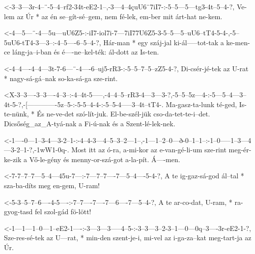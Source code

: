   {<-3--3---3r-4--¨-5--4--rf2-34t-eE2-1--,-3---4--4çuU6¨7iI7-:-5--5---5---tg3-4t--5--4-?,}
  {  Ve-lem az Úr * az én se--gít-sé--gem, nem fé-lek,         em-ber mit árt-hat ne-kem.}

  {<-4---5---¨-4---5u---uU6Z5-:-iI7-iol7i-7---7iI77U6Z5-3-5--5---5--uU6--tT4-5-4-,-5--5uU6-tT4-3---3--:-4--5----6--5--4-?,}
  {  Hár-man * egy száj-jal     ki-ál-----tot-tak       a ke-men-ce láng-ja--i-ban és é----ne--kel-ték: ál-dott az Is-ten.}

  {<-4--4----4--4---3t-7-6---¨-4----6--uj5-rR3-:-5--5--7--5--zZ5-4-?,}
  {  Di-csér-jé-tek az U-rat * nagy-sá-gá--nak   so-ka-sá-ga sze-rint.}

  {<X-3--3----3--3----4--3--:-4--4t-5-----,-4--4--5--rR3-4---3---3-?,-5--5--5z---4-:-5---5--4---3--4t-5-?,-[-------------5z--5-:-5-5--4-4-:-5--5-4-----3--4t--tT4-.}
  {   Ma-gasz-ta-lunk té-ged, Is-te-nünk, * És ne-ve-det szó-lít-juk. El-be-szél-jük cso-da-tet-te-i--det. Dicsőség_az_A-tyá-nak a Fi-ú-nak és a Szent-lé-lek-nek.}



  {<-1----0---1--3-4---3-2--1-:-4--4-3---4--5--3--2---1--,-1---1--2--0---ð-0--1--1--:-1--0-----1--3---4---3-2--1-?,-1wW1-0q-.}
  {  Most itt az ó-ra, a-mi-kor az e-van-gé-li-um sze-rint meg-ér-ke-zik a Vő-le-gény és menny-or-szá-got a-la-pít. Á----men.}

  {<-7-7--7--7---5--4---45u-7---:-7---7--7----7---5--4----5-4-?,}
  {  A te ig-gaz-sá-god ál--tal * sza-ba-díts meg en-gem, U-ram!}

  {<-5-3--5--7--6----4-5----:-7--7----7----7---6----7---5--4-?,}
  {  A te ar-co-dat, U-ram, * ra-gyog-tasd fel szol-gád fö-lött!}

  {<-1---1---1--0---1--eE2-1----:-3---3---3-----4--5-:-3--3---3--2-3--1---0---0q--3----3r-eE2-1-?,}
  {  Sze-res-sé-tek az U---rat, * min-den szent-je-i,  mi-vel az i-ga-za--kat meg-tart-ja az  Úr.}


